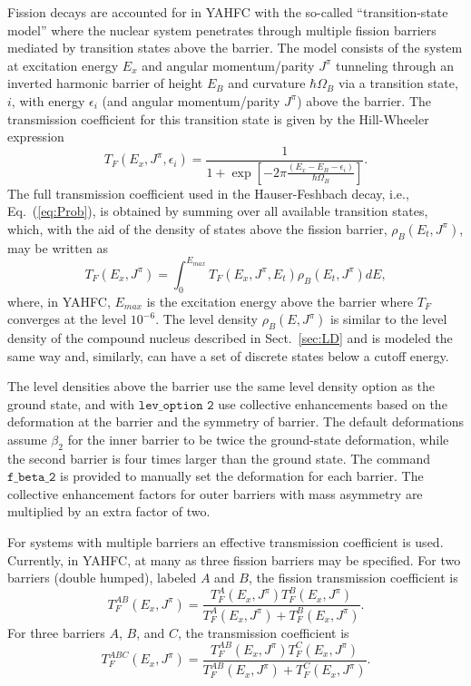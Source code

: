\documentclass[
10pt,
showpacs,preprintnumbers,footinbib,
amsfonts,amsmath,amssymb,
aps,
prc,twocolumn,groupedaddress,superscriptaddress,
showkeys,
nofootinbib
]{revtex4-1}
\begin{document}
Fission decays are accounted for in YAHFC with the so-called ``transition-state model'' where the nuclear system penetrates through multiple fission barriers mediated by transition states above the barrier. The model consists of the system at excitation energy $E_x$ and angular momentum/parity $J^\pi$ tunneling  through an inverted harmonic barrier of height $E_B$ and curvature $\hbar\Omega_B$ via a transition state, $i$, with energy $\epsilon_i$ (and angular momentum/parity $J^\pi$) above the barrier. The transmission coefficient for this transition state is given by the Hill-Wheeler expression
\begin{equation}
T_F(E_x,J^\pi,\epsilon_i)  = \frac{1} { 1 + \exp\left [-2\pi\frac{(E_x - E_B - \epsilon_i) } {\hbar\Omega_B }\right ] }.
\end{equation}
The full transmission coefficient used in the Hauser-Feshbach decay, i.e., Eq.~(\ref{eq:Prob}), is obtained by summing over all available transition states, which, with the aid of the density of states above the fission barrier, $\rho_B(E_t,J^\pi)$, may be written as
\begin{equation}
T_F(E_x,J^\pi) = \int_0^{E_{max}} T_F(E_x,J^\pi,E_t) \rho_B(E_t,J^\pi)dE,
\end{equation}
where, in YAHFC, $E_{max}$ is the excitation energy above the barrier where $T_F$ converges at the level $10^{-6}$.
The level density $\rho_B(E,J^\pi)$ is similar to the level density of the compound nucleus described in Sect.~\ref{sec:LD} and is modeled the same way and, similarly, can have a set of discrete states below a cutoff energy. 

The level densities above the barrier use the same level density option as the ground state, and with ${\texttt{lev\_option 2}}$ use collective enhancements based on the deformation at the barrier and the symmetry of barrier. The default deformations assume $\beta_2$ for the inner barrier to be twice the ground-state deformation, while the second barrier is four times larger than the ground state. The command ${\texttt{f\_beta\_2}}$ is provided to manually set the deformation for each barrier. The collective enhancement factors for outer barriers with mass asymmetry are multiplied by an extra factor of two.

For systems with multiple barriers an effective transmission coefficient is used. Currently, in YAHFC, at many as three fission barriers may be specified. For two barriers (double humped), labeled $A$ and $B$, the fission transmission coefficient is
\begin{equation}
T_{F}^{AB}(E_x,J^\pi) = \frac{ T_{F}^{A}(E_x,J^\pi)T_{F}^{B}(E_x,J^\pi) } { T_{F}^{A}(E_x,J^\pi)+T_{F}^{B}(E_x,J^\pi)}.
\label{eq:Two-Barr}
\end{equation}
For three barriers $A$, $B$, and $C$, the transmission coefficient is
\begin{equation}
T_{F}^{ABC}(E_x,J^\pi) = \frac{ T_{F}^{AB}(E_x,J^\pi)T_{F}^{C}(E_x,J^\pi) } { T_{F}^{AB}(E_x,J^\pi)+T_{F}^{C}(E_x,J^\pi)}.
\end{equation}
\end{document}
